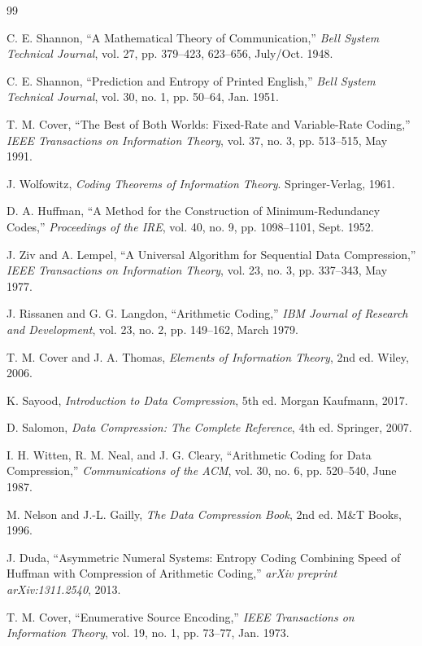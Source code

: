 \documentclass[10pt, onecolumn]{IEEEtran}
\begin{document}
\begin{thebibliography}{99}

C. E. Shannon, ``A Mathematical Theory of Communication,'' \textit{Bell System Technical Journal}, vol. 27, pp. 379--423, 623--656, July/Oct. 1948.

C. E. Shannon, ``Prediction and Entropy of Printed English,'' \textit{Bell System Technical Journal}, vol. 30, no. 1, pp. 50--64, Jan. 1951.

T. M. Cover, ``The Best of Both Worlds: Fixed-Rate and Variable-Rate Coding,'' \textit{IEEE Transactions on Information Theory}, vol. 37, no. 3, pp. 513--515, May 1991.

J. Wolfowitz, \textit{Coding Theorems of Information Theory}. Springer-Verlag, 1961.

D. A. Huffman, ``A Method for the Construction of Minimum-Redundancy Codes,'' \textit{Proceedings of the IRE}, vol. 40, no. 9, pp. 1098--1101, Sept. 1952.

J. Ziv and A. Lempel, ``A Universal Algorithm for Sequential Data Compression,'' \textit{IEEE Transactions on Information Theory}, vol. 23, no. 3, pp. 337--343, May 1977.

J. Rissanen and G. G. Langdon, ``Arithmetic Coding,'' \textit{IBM Journal of Research and Development}, vol. 23, no. 2, pp. 149--162, March 1979.

T. M. Cover and J. A. Thomas, \textit{Elements of Information Theory}, 2nd ed. Wiley, 2006.

K. Sayood, \textit{Introduction to Data Compression}, 5th ed. Morgan Kaufmann, 2017.

D. Salomon, \textit{Data Compression: The Complete Reference}, 4th ed. Springer, 2007.

I. H. Witten, R. M. Neal, and J. G. Cleary, ``Arithmetic Coding for Data Compression,'' \textit{Communications of the ACM}, vol. 30, no. 6, pp. 520--540, June 1987.

M. Nelson and J.-L. Gailly, \textit{The Data Compression Book}, 2nd ed. M\&T Books, 1996.

J. Duda, ``Asymmetric Numeral Systems: Entropy Coding Combining Speed of Huffman with Compression of Arithmetic Coding,'' \textit{arXiv preprint arXiv:1311.2540}, 2013.

T. M. Cover, ``Enumerative Source Encoding,'' \textit{IEEE Transactions on Information Theory}, vol. 19, no. 1, pp. 73--77, Jan. 1973.


\end{thebibliography}
\end{document}
